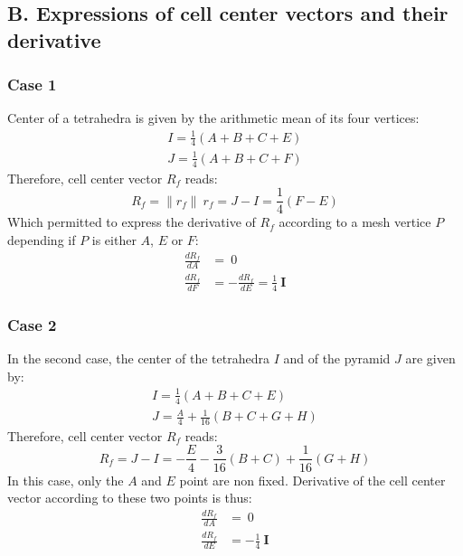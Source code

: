\documentclass[11pt]{article}
\begin{document}
\subsection*{B. Expressions of cell center vectors and their derivative}

\subsubsection*{Case 1}

Center of a tetrahedra is given by the arithmetic mean of its four vertices:
\begin{subequations}
\begin{gather}
I = \frac{1}{4} (A + B + C + E) \\
J = \frac{1}{4} (A + B + C + F)
\end{gather}
\end{subequations} 
Therefore, cell center vector $R_f$ reads:
\begin{equation}
R_f = \| r_f \|\ r_f = J-I = \frac{1}{4} (F - E)
\end{equation}
Which permitted to express the derivative of $R_f$ according to a mesh vertice $P$ depending if $P$ is either $A$, $E$ or $F$:
\begin{subequations}
\begin{align}
\frac{d R_f}{d A} &= \ 0 \\
\frac{d R_f}{d F} &= - \frac{d R_f}{d E} = \frac{1}{4}\ \boldsymbol{I}
\end{align}
\end{subequations} 

\subsubsection*{Case 2}

In the second case, the center of the tetrahedra $I$ and of the pyramid $J$ are given by:
\begin{subequations}
\begin{gather}
I = \frac{1}{4} (A + B + C + E) \\
J = \frac{A}{4} + \frac{1}{16} (B + C + G + H)
\end{gather}
\end{subequations} 
Therefore, cell center vector $R_f$ reads:
\begin{equation}
R_f = J-I = -\frac{E}{4} - \frac{3}{16} (B + C) + \frac{1}{16} ( G + H)
\end{equation}
In this case, only the $A$ and $E$ point are non fixed. Derivative of the cell center vector according to these two points is thus:
\begin{subequations}
\begin{align}
\frac{d R_f}{d A} &= \ 0 \\
\frac{d R_f}{d E} &= - \frac{1}{4}\ \boldsymbol{I}
\end{align}
\end{subequations}
\end{document}
